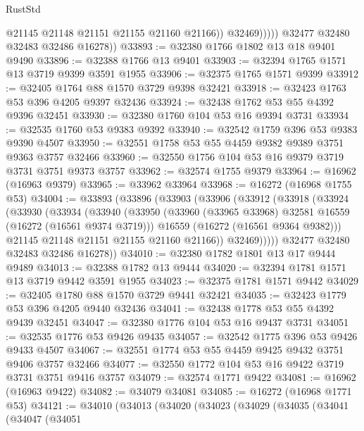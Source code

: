 \begin{lexlean}{RustStd}
\begin{coremodule}
                      @21145
                      @21148
                      @21151
                      @21155
                      @21160
                      @21166))
                  @32469)))))
        @32477
        @32480
        @32483
        @32486
        @16278))
@33893 := @32380 @1766 @1802 @13 @18 @9401 @9490
@33896 := @32388 @1766 @13 @9401
@33903 := @32394 @1765 @1571 @13 @3719 @9399 @3591 @1955
@33906 := @32375 @1765 @1571 @9399
@33912 := @32405 @1764 @88 @1570 @3729 @9398 @32421
@33918 := @32423 @1763 @53 @396 @4205 @9397 @32436
@33924 := @32438 @1762 @53 @55 @4392 @9396 @32451
@33930 := @32380 @1760 @104 @53 @16 @9394 @3731
@33934 := @32535 @1760 @53 @9383 @9392
@33940 := @32542 @1759 @396 @53 @9383 @9390 @4507
@33950 := @32551 @1758 @53 @55 @4459 @9382 @9389 @3751 @9363 @3757 @32466
@33960 := @32550 @1756 @104 @53 @16 @9379 @3719 @3731 @3751 @9373 @3757
@33962 := @32574 @1755 @9379
@33964 := @16962 (@16963 @9379)
@33965 := @33962 @33964
@33968 := @16272 (@16968 @1755 @53)
@34004 := @33893
    (@33896
      (@33903
        (@33906
          (@33912
            (@33918
              (@33924
                (@33930
                  (@33934
                    (@33940
                      (@33950
                        (@33960 (@33965 @33968) @32581 @16559 (@16272 (@16561 @9374 @3719)))
                        @16559
                        (@16272 (@16561 @9364 @9382)))
                      @21145
                      @21148
                      @21151
                      @21155
                      @21160
                      @21166))
                  @32469)))))
        @32477
        @32480
        @32483
        @32486
        @16278))
@34010 := @32380 @1782 @1801 @13 @17 @9444 @9489
@34013 := @32388 @1782 @13 @9444
@34020 := @32394 @1781 @1571 @13 @3719 @9442 @3591 @1955
@34023 := @32375 @1781 @1571 @9442
@34029 := @32405 @1780 @88 @1570 @3729 @9441 @32421
@34035 := @32423 @1779 @53 @396 @4205 @9440 @32436
@34041 := @32438 @1778 @53 @55 @4392 @9439 @32451
@34047 := @32380 @1776 @104 @53 @16 @9437 @3731
@34051 := @32535 @1776 @53 @9426 @9435
@34057 := @32542 @1775 @396 @53 @9426 @9433 @4507
@34067 := @32551 @1774 @53 @55 @4459 @9425 @9432 @3751 @9406 @3757 @32466
@34077 := @32550 @1772 @104 @53 @16 @9422 @3719 @3731 @3751 @9416 @3757
@34079 := @32574 @1771 @9422
@34081 := @16962 (@16963 @9422)
@34082 := @34079 @34081
@34085 := @16272 (@16968 @1771 @53)
@34121 := @34010
    (@34013
      (@34020
        (@34023
          (@34029
            (@34035
              (@34041
                (@34047
                  (@34051

\end{coremodule}
\end{lexlean}
